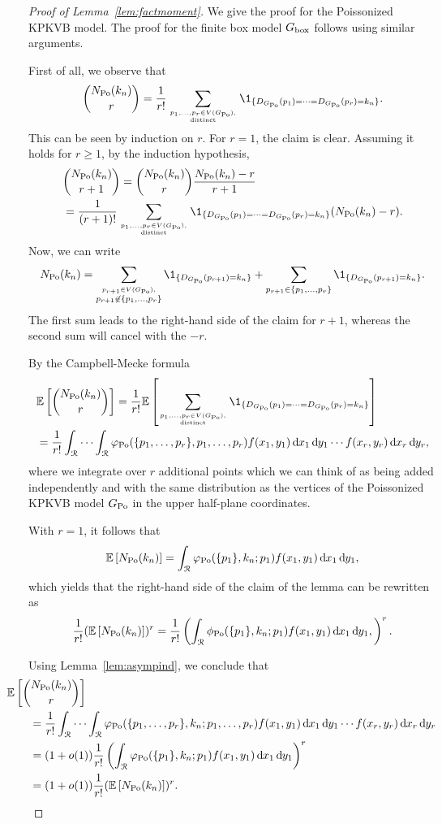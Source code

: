 \begin{proof}[Proof of Lemma~\ref{lem:factmoment}]
We give the proof for the Poissonized KPKVB model. The proof for the finite box model $G_{\mathrm{box}}$ follows using similar arguments.

First of all, we observe that
\begin{align*}
{N_{\Po}(k_n) \choose r} = \frac{1}{r!} \sum_{p_1,\dots,p_r\in V(\GPo), \atop \text{distinct}} \1_{\{D_{\GPo}(p_1)=\dots=D_{\GPo}(p_r)=k_n\}}.
\end{align*}
This can be seen by induction on $r$. For $r=1$, the claim is clear. Assuming it holds for $r\geq 1$, by the induction hypothesis,
\begin{align*}
&{N_{\Po}(k_n) \choose r+1} = {N_{\Po}(k_n) \choose r} \frac{N_{\Po}(k_n)-r}{r+1} \\
&= \frac{1}{(r+1)!}\sum_{p_1,\dots,p_r\in V(\GPo), \atop \text{distinct}} \1_{\{D_{\GPo}(p_1)=\dots=D_{\GPo}(p_r)=k_n\}} (N_{\Po}(k_n)-r).
\end{align*}
Now, we can write
\[
	N_{\Po}(k_n) = \sum_{\stackrel{p_{r+1} \in V(\GPo),}{p_{r+1} \not \in\{ p_1,\dots,p_r\}} } \1_{\{D_{\GPo}(p_{r+1})=k_n\}}+\sum_{p_{r+1} \in \{p_1,\dots,p_r\}}\1_{\{D_{\GPo}(p_{r+1})=k_n\}}.
\]
The first sum leads to the right-hand side of the claim for $r+1$, whereas the second sum will cancel with the $-r$.

By the Campbell-Mecke formula 
\begin{align*}
	&\Exp{ {N_{\Po}(k_n) \choose r}}=\frac{1}{r!} \E\left[ \sum_{p_1,\dots,p_r\in V(\GPo), \atop \text{distinct}}  
		\1_{\{D_{\GPo}(p_1)=\dots=D_{\GPo}(p_r)=k_n\}}\right] \\
	&=\frac{1}{r!} \int_\Rcal \cdots \int_\Rcal \varphi_{\Po}(\{p_1,\dots,p_r\},p_1,\dots,p_r)
		f(x_1,y_1) \dd x_1 \dd y_1 \cdots f(x_{r},y_{r})\dd x_{r} \dd y_{r},
\end{align*}
where we integrate over $r$ additional points which we can think of as being added independently and with the same distribution as the vertices of the Poissonized KPKVB model $G_{{\mathrm{Po}}}$ in the upper half-plane coordinates.

With $r=1$, it follows that
\[
	\mathbb{E}\left[N_{{\mathrm{Po}}}(k_n)\right] = \int_{{\mathcal R}} \varphi_{{\mathrm{Po}}}(\{p_1\}, k_n ; p_1) f(x_1,y_1) \operatorname{\mathrm{d}\hspace{-2pt}} x_1 \operatorname{\mathrm{d}\hspace{-2pt}} y_1,
\]
which yields that the right-hand side of the claim of the lemma can be rewritten as
\[
	\frac{1}{r!}(\mathbb{E}\left[N_{{\mathrm{Po}}}(k_n)\right])^r = \frac{1}{r!}\left(\int_{{\mathcal R}} \phi_{{\mathrm{Po}}}(\{p_1\}, k_n; p_1) f(x_1,y_1) \operatorname{\mathrm{d}\hspace{-2pt}} x_1 \operatorname{\mathrm{d}\hspace{-2pt}} y_1,\right)^r.
\]

Using Lemma~\ref{lem:asympind}, we conclude that
\begin{align*}
	&\hspace{-20pt}\Exp{ { N_{\Po}(k_n) \choose r}} \\
	&= \frac{1}{r!} \int_\Rcal \cdots \int_\Rcal 
		\varphi_{\Po}(\{p_1,\dots,p_r\}, k_n; p_1,\dots,p_r) 
		f(x_1,y_1) \dd x_1 \dd y_1 \cdots f(x_{r},y_{r})\dd x_{r} \dd y_{r} \\
	&= (1+o(1))\frac{1}{r!}\left(\int_\Rcal \varphi_{\Po}(\{p_1\}, k_n;p_1) f(x_1,y_1) \dd x_1 \dd y_1 \right)^r \\
	&= (1+o(1))\frac{1}{r!}(\Exp{N_{\Po}(k_n)})^r.
\end{align*}
\end{proof}

